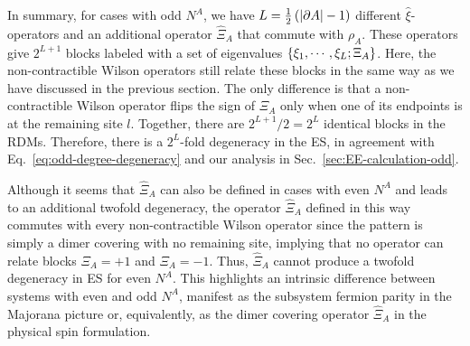 In summary, for cases with odd $N^A$, we have $L = \frac{1}{2}\left( \abs{\partial A} - 1 \right)$ different $\hat{\xi}$-operators and an additional operator $\hat{\Xi}_A$ that commute with $\rho_A$. These operators give $2^{L+1}$ blocks labeled with a set of eigenvalues $\left\{ \xi_1,\cdots,\xi_L;\Xi_A \right\}$. Here, the non-contractible Wilson operators still relate these blocks in the same way as we have discussed in the previous section. The only difference is that a non-contractible Wilson operator flips the sign of $\Xi_A$ only when one of its endpoints is at the remaining site $l$. {Together, there are $2^{L+1}/2 = 2^L$ identical blocks in the RDMs. Therefore, there is a $2^{L}$-fold degeneracy in the ES, in agreement with Eq.~\eqref{eq:odd-degree-degeneracy} and our analysis in Sec.~\ref{sec:EE-calculation-odd}.}

Although it seems that $\hat{\Xi}_A$ can also be defined in cases with even $N^A$ and leads to an additional twofold degeneracy, the operator $\hat{\Xi}_A$ defined in this way commutes with every non-contractible Wilson operator since the pattern is simply a dimer covering with no remaining site, implying that no operator can relate blocks $\Xi_A=+1$ and $\Xi_A=-1$.  Thus, $\hat{\Xi}_A$ cannot produce a twofold degeneracy in ES for even $N^A$. This highlights an intrinsic difference between systems with even and odd $N^A$, manifest as the subsystem fermion parity in the Majorana picture or, equivalently, as the dimer covering operator $\hat{\Xi}_A$ in the physical spin formulation.